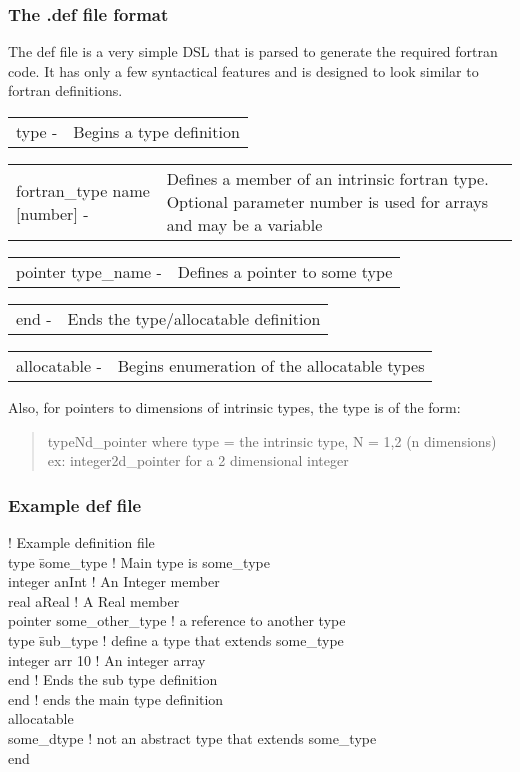 \documentclass{article}
\begin{document}
\subsubsection{The .def file format}
\newcommand{\syn}[2]{
   \begin{tabular}{lp{0.7\textwidth}}
      #1 - & #2
   \end{tabular}
}
The def file is a very simple DSL that is parsed to generate the required fortran code. It has only a few syntactical features and is designed to look similar to fortran definitions.
\begin{list}{}{}
\item \syn {type}{Begins a type definition}
\item \syn{fortran\_type name [number]}{Defines a member of an intrinsic fortran type. Optional parameter number is used for arrays and may be a variable}
\item \syn{pointer type\_name}{Defines a pointer to some type}
\item \syn{end}{Ends the type/allocatable definition}
\item \syn{allocatable}{Begins enumeration of the allocatable types}
\end{list}
Also, for pointers to dimensions of intrinsic types, the type is of the form:
\begin{quote}
   typeNd\_pointer where type = the intrinsic type, N = 1,2 (n dimensions) \\
   ex: integer2d\_pointer for a 2 dimensional integer
\end{quote}
\subsubsection{Example def file}
\begin{tabbing}
! Example definition file \\
type \= some\_type ! Main type is some\_type \\
\> integer anInt ! An Integer member \\
\> real aReal ! A Real member \\
\> pointer some\_other\_type ! a reference to another type \\
\> type \= sub\_type ! define a type that extends some\_type \\
\> \> integer arr 10 ! An integer array \\
\> end ! Ends the sub type definition \\
end ! ends the main type definition \\
allocatable \\
\> some\_dtype ! not an abstract type that extends some\_type \\
end \\
\end{tabbing}
\end{document}
